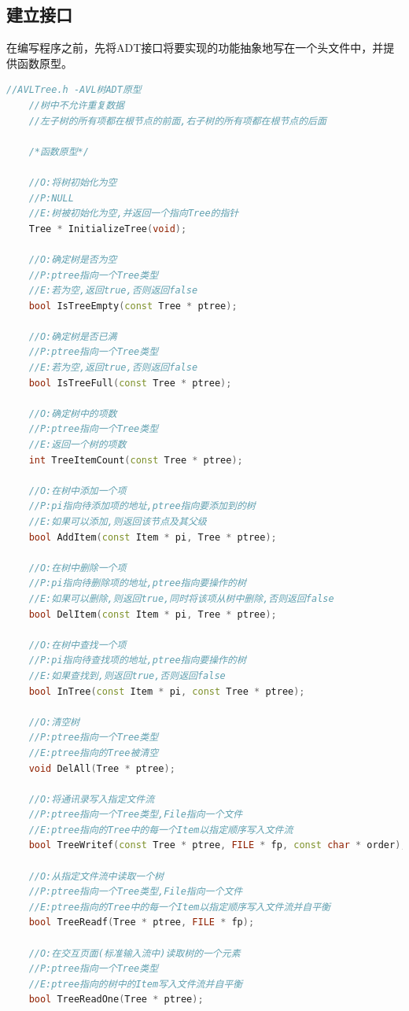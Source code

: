 \documentclass[12pt, a4paper, oneside]{ctexart}
\begin{document}
\subsection{建立接口}
在编写程序之前，先将ADT接口将要实现的功能抽象地写在一个头文件中，并提供函数原型。
\begin{framed}
\begin{lstlisting}[language=C++]
    //AVLTree.h -AVL树ADT原型
    //树中不允许重复数据
    //左子树的所有项都在根节点的前面,右子树的所有项都在根节点的后面
    
    /*函数原型*/

    //O:将树初始化为空
    //P:NULL
    //E:树被初始化为空,并返回一个指向Tree的指针
    Tree * InitializeTree(void);

    //O:确定树是否为空
    //P:ptree指向一个Tree类型
    //E:若为空,返回true,否则返回false
    bool IsTreeEmpty(const Tree * ptree);

    //O:确定树是否已满
    //P:ptree指向一个Tree类型
    //E:若为空,返回true,否则返回false
    bool IsTreeFull(const Tree * ptree);

    //O:确定树中的项数
    //P:ptree指向一个Tree类型
    //E:返回一个树的项数
    int TreeItemCount(const Tree * ptree);

    //O:在树中添加一个项
    //P:pi指向待添加项的地址,ptree指向要添加到的树
    //E:如果可以添加,则返回该节点及其父级
    bool AddItem(const Item * pi, Tree * ptree);

    //O:在树中删除一个项
    //P:pi指向待删除项的地址,ptree指向要操作的树
    //E:如果可以删除,则返回true,同时将该项从树中删除,否则返回false
    bool DelItem(const Item * pi, Tree * ptree);

    //O:在树中查找一个项
    //P:pi指向待查找项的地址,ptree指向要操作的树
    //E:如果查找到,则返回true,否则返回false
    bool InTree(const Item * pi, const Tree * ptree);

    //O:清空树
    //P:ptree指向一个Tree类型
    //E:ptree指向的Tree被清空
    void DelAll(Tree * ptree);

    //O:将通讯录写入指定文件流
    //P:ptree指向一个Tree类型,File指向一个文件
    //E:ptree指向的Tree中的每一个Item以指定顺序写入文件流
    bool TreeWritef(const Tree * ptree, FILE * fp, const char * order);

    //O:从指定文件流中读取一个树
    //P:ptree指向一个Tree类型,File指向一个文件
    //E:ptree指向的Tree中的每一个Item以指定顺序写入文件流并自平衡
    bool TreeReadf(Tree * ptree, FILE * fp);

    //O:在交互页面(标准输入流中)读取树的一个元素
    //P:ptree指向一个Tree类型
    //E:ptree指向的树中的Item写入文件流并自平衡
    bool TreeReadOne(Tree * ptree);


\end{lstlisting}
\end{framed}
\end{document}
